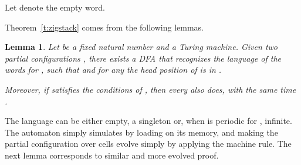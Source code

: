 \documentclass{llncs}
\newtheorem{lem}{Lemma}
\begin{document}
Let  denote the empty word.

Theorem~\ref{t:zigstack} comes from the following lemmas.

\begin{lem}\label{l:centerDFA}
Let  be a fixed natural number and  a Turing machine.
Given two partial configurations , there exists a DFA  that recognizes the language  of the words  for ,  such that  and for any  the head position of  is in .

Moreover, if  satisfies the conditions of , then every  also does, with the same time .
\end{lem}

The language  can be either empty, a singleton or, when  is periodic for , infinite.
The automaton  simply simulates  by loading  on its memory, and making the partial configuration over cells  evolve simply by applying the machine rule.
The next lemma corresponds to similar and more evolved proof.
\end{document}
